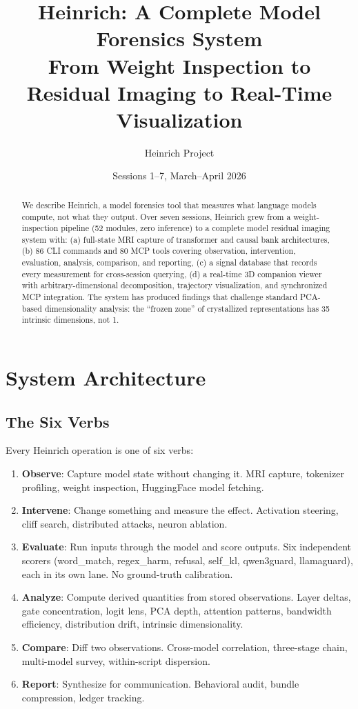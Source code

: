 \documentclass[11pt]{article}
\title{Heinrich: A Complete Model Forensics System\\
\large{From Weight Inspection to Residual Imaging to Real-Time Visualization}}
\author{Heinrich Project}
\date{Sessions 1--7, March--April 2026}
\begin{document}
\maketitle

\begin{abstract}
We describe Heinrich, a model forensics tool that measures what language models compute, not what they output. Over seven sessions, Heinrich grew from a weight-inspection pipeline (52 modules, zero inference) to a complete model residual imaging system with: (a) full-state MRI capture of transformer and causal bank architectures, (b) 86 CLI commands and 80 MCP tools covering observation, intervention, evaluation, analysis, comparison, and reporting, (c) a signal database that records every measurement for cross-session querying, (d) a real-time 3D companion viewer with arbitrary-dimensional decomposition, trajectory visualization, and synchronized MCP integration. The system has produced findings that challenge standard PCA-based dimensionality analysis: the ``frozen zone'' of crystallized representations has 35 intrinsic dimensions, not 1.
\end{abstract}

\section{System Architecture}

\subsection{The Six Verbs}

Every Heinrich operation is one of six verbs:

\begin{enumerate}
\item \textbf{Observe}: Capture model state without changing it. MRI capture, tokenizer profiling, weight inspection, HuggingFace model fetching.
\item \textbf{Intervene}: Change something and measure the effect. Activation steering, cliff search, distributed attacks, neuron ablation.
\item \textbf{Evaluate}: Run inputs through the model and score outputs. Six independent scorers (word\_match, regex\_harm, refusal, self\_kl, qwen3guard, llamaguard), each in its own lane. No ground-truth calibration.
\item \textbf{Analyze}: Compute derived quantities from stored observations. Layer deltas, gate concentration, logit lens, PCA depth, attention patterns, bandwidth efficiency, distribution drift, intrinsic dimensionality.
\item \textbf{Compare}: Diff two observations. Cross-model correlation, three-stage chain, multi-model survey, within-script dispersion.
\item \textbf{Report}: Synthesize for communication. Behavioral audit, bundle compression, ledger tracking.
\end{enumerate}
\end{document}
